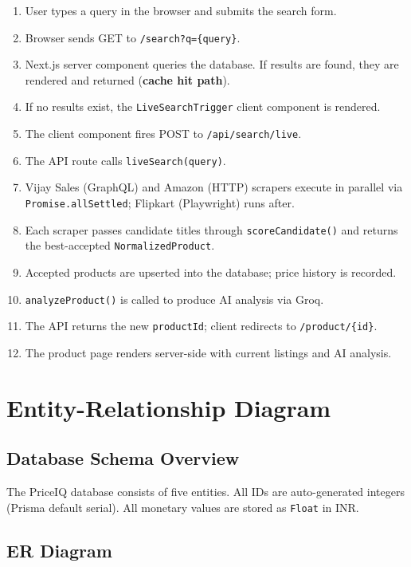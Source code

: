 \documentclass[12pt,a4paper]{report}
\begin{document}
\begin{enumerate}[noitemsep]
  \item User types a query in the browser and submits the search form.
  \item Browser sends GET to \texttt{/search?q=\{query\}}.
  \item Next.js server component queries the database. If results are found,
        they are rendered and returned (\textbf{cache hit path}).
  \item If no results exist, the \texttt{LiveSearchTrigger} client component
        is rendered.
  \item The client component fires POST to \texttt{/api/search/live}.
  \item The API route calls \texttt{liveSearch(query)}.
  \item Vijay Sales (GraphQL) and Amazon (HTTP) scrapers execute in parallel
        via \texttt{Promise.allSettled}; Flipkart (Playwright) runs after.
  \item Each scraper passes candidate titles through \texttt{scoreCandidate()}
        and returns the best-accepted \texttt{NormalizedProduct}.
  \item Accepted products are upserted into the database; price history is
        recorded.
  \item \texttt{analyzeProduct()} is called to produce AI analysis via Groq.
  \item The API returns the new \texttt{productId}; client redirects to
        \texttt{/product/\{id\}}.
  \item The product page renders server-side with current listings and AI analysis.
\end{enumerate}

\chapter{Entity-Relationship Diagram}

\section{Database Schema Overview}
The PriceIQ database consists of five entities. All IDs are auto-generated
integers (Prisma default serial). All monetary values are stored as
\texttt{Float} in INR.

\section{ER Diagram}
\end{document}
